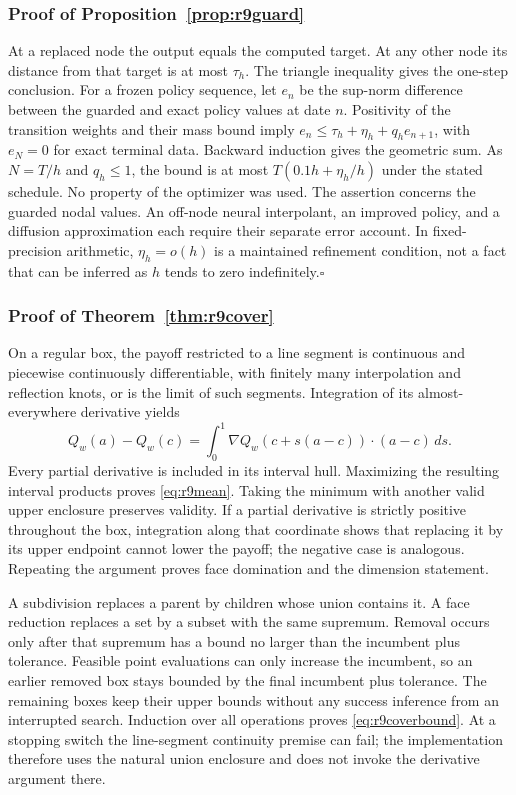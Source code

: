 \subsubsection{Proof of Proposition~\ref{prop:r9guard}}
At a replaced node the output equals the computed target. At any other node its distance from that target is at most $\tau_h$. The triangle inequality gives the one-step conclusion. For a frozen policy sequence, let $e_n$ be the sup-norm difference between the guarded and exact policy values at date $n$. Positivity of the transition weights and their mass bound imply $e_n\leq\tau_h+\eta_h+q_he_{n+1}$, with $e_N=0$ for exact terminal data. Backward induction gives the geometric sum. As $N=T/h$ and $q_h\leq1$, the bound is at most $T(0.1h+\eta_h/h)$ under the stated schedule. No property of the optimizer was used. The assertion concerns the guarded nodal values. An off-node neural interpolant, an improved policy, and a diffusion approximation each require their separate error account. In fixed-precision arithmetic, $\eta_h=o(h)$ is a maintained refinement condition, not a fact that can be inferred as $h$ tends to zero indefinitely.\hfill$\square$

\subsubsection{Proof of Theorem~\ref{thm:r9cover}}
On a regular box, the payoff restricted to a line segment is continuous and piecewise continuously differentiable, with finitely many interpolation and reflection knots, or is the limit of such segments. Integration of its almost-everywhere derivative yields
\[
 Q_w(a)-Q_w(c)=\int_0^1 \nabla Q_w(c+s(a-c))\cdot(a-c)\,ds.
\]
Every partial derivative is included in its interval hull. Maximizing the resulting interval products proves \eqref{eq:r9mean}. Taking the minimum with another valid upper enclosure preserves validity. If a partial derivative is strictly positive throughout the box, integration along that coordinate shows that replacing it by its upper endpoint cannot lower the payoff; the negative case is analogous. Repeating the argument proves face domination and the dimension statement.

A subdivision replaces a parent by children whose union contains it. A face reduction replaces a set by a subset with the same supremum. Removal occurs only after that supremum has a bound no larger than the incumbent plus tolerance. Feasible point evaluations can only increase the incumbent, so an earlier removed box stays bounded by the final incumbent plus tolerance. The remaining boxes keep their upper bounds without any success inference from an interrupted search. Induction over all operations proves \eqref{eq:r9coverbound}. At a stopping switch the line-segment continuity premise can fail; the implementation therefore uses the natural union enclosure and does not invoke the derivative argument there.

